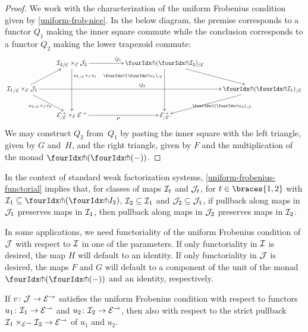 \documentclass[reqno,10pt,a4paper,oneside,draft]{amsart}
\begin{document}
\begin{proof}
We work with the characterization of the uniform Frobenius condition given by \cref{uniform-frob-nice}.
In the below diagram, the premise corresponds to a functor $Q_1$ making the inner square commute while the conclusion corresponds to a functor $Q_2$ making the lower trapezoid commute:
\[
\xymatrix{
&
  {\cal{I}_2}_{/\cal{E}} \times_{\cal{E}} \cal{J}_2
  \ar[rr]^{Q_1}
  \ar[dd]^(0.25){{u_1}_{/\cal{E}} \times_{\cal{E}} v_1}
&&
  \liftl{(\liftr{\cal{I}_2})}_{/\cal{E}}
  \ar[dr]
  \ar[dd]_(0.25){\liftl{(\liftr{u_1})}_{/\cal{E}}}
\\
  {\cal{I}_1}_{/\cal{E}} \times_{\cal{E}} \cal{J}_1
  \ar[ur]
  \ar[dr]_{{u_2}_{/\cal{E}} \times_{\cal{E}} v_2}
  \ar[rrrr]^{Q_2}
&&&&
  \liftl{(\liftr{\cal{I}_1})}_{/\cal{E}}
  \ar[dl]^{\liftl{(\liftr{u_2})}_{/\cal{E}}}
\\&
  \cal{E}^\to_{/\cal{E}} \times_{\cal{E}} \cal{E}^\to
  \ar[rr]_{P}
&&
  \cal{E}^\to_{/\cal{E}}
\rlap{.}}
\]
We may construct $Q_2$ from~$Q_1$ by pasting the inner square with the left triangle, given by $G$ and~$H$, and the right triangle, given by $F$ and the multiplication of the monad $\liftl{(\liftr{(-)})}$.
\end{proof}

In the context of standard weak factorization systems, \cref{uniform-frobenius-functorial} implies that, for classes of maps $\cal{I}_t$ and $\cal{J}_t$, for $t \in \braces{1, 2}$ with $\cal{I}_1 \subseteq \liftl{(\liftr{I_2})}$, $\cal{I}_2 \subseteq \cal{I}_1$ and $\cal{J}_2 \subseteq \cal{J}_1$, if pullback along maps in $\cal{J}_1$ preserves maps in $\cal{I}_1$, then pullback along maps in $\cal{J}_2$ preserves maps in $\cal{I}_2$.

\begin{remark}
In some applications, we need functoriality of the uniform Frobenius condition of $\cal{J}$ with respect to $\cal{I}$ in one of the parameters.
If only functoriality in $\cal{I}$ is desired, the map $H$ will default to an identity.
If only functoriality in $\cal{J}$ is desired, the maps $F$ and $G$ will default to a component of the unit of the monad $\liftl{(\liftr{(-)})}$ and an identity, respectively.
\end{remark}

\begin{proposition} \label{uniform-frobenius-product-u}
If $v \co \cal{J} \to \cal{E}^\to$ satisfies the uniform Frobenius condition with respect to functors $u_1 \co \cal{I}_1 \to \cal{E}^\to$ and $u_2 \co \cal{I}_2 \to \cal{E}^\to$, then also with respect to the strict pullback $\cal{I}_1 \times_{\cal{E}^\to} \cal{I}_2 \to \cal{E}^\to$ of $u_1$ and $u_2$.
\end{proposition}
\end{document}
